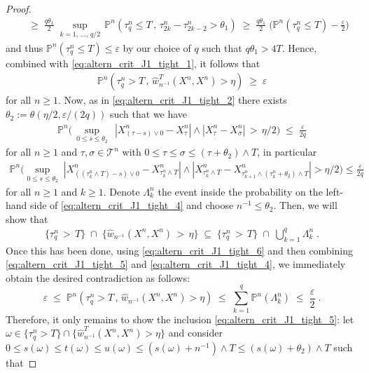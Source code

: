 \documentclass[11pt]{article}
\theoremstyle{definition}\newtheorem{example}[theorem]{Example}
\theoremstyle{definition}\newtheorem{counterexample}[theorem]{Counterexample}
\theoremstyle{definition}\newtheorem{remark}[theorem]{Remark}
\theoremstyle{definition}\newtheorem{defi}[theorem]{Definition}
\numberwithin{equation}{section}
\newcommand{\Pro}{\mathbb{P}}										%
\renewcommand{\sup}[1]{\underset{#1}{\operatorname{sup}}\;}					%
\renewcommand{\|}{\; : \, \;}											%
\begin{document}
\begin{proof}
\begin{align*}
		\;\;&\ge  \; \frac{q\theta_1}{2} \; \operatorname{sup}_{k=1,\, ...,\, q/2} \, \Pro^n(\tau^n_q \le T\, , \, \tau^n_{2k}-\tau^n_{2k-2} > \theta_1 ) \; \ge \; \frac{q\theta_1}{2} \; \Big( \Pro^n(\tau^n_q \le T) - \frac{\varepsilon}{2} \Big) 
	\end{align*}
	and thus $\Pro^n(\tau^n_q \le T)\le \varepsilon$ by our choice of $q$ such that $q \theta_1> 4T$. Hence, combined with \eqref{eq:altern_crit_J1_tight_1}, it follows that 
	\begin{align}
		\Pro^n(\tau^n_q> T \, , \, \hat w^T_{n^{-1}}(X^n,X^n)>\eta)  \;\ge  \; \varepsilon \label{eq:altern_crit_J1_tight_6}
	\end{align} 
	for all $n\ge 1$. Now, as in \eqref{eq:altern_crit_J1_tight_2} there exists $\theta_2:=\theta(\eta/2, \varepsilon/(2q))$ such that we have 
	\begin{align} 
		\Pro^n\Big( \, \sup{0\le s \le \theta_2} \, |X^n_{(\tau-s)\vee 0}-X^n_\tau|\wedge |X^n_{\tau}-X^n_{\sigma}| \, > \, \eta/2 \Big) \; \le \; \frac \varepsilon {2q} 
	\end{align}
	for all $n\ge 1$ and $\tau, \sigma \in \mathcal{T}^n$ with $0\le \tau \le \sigma \le (\tau+ \theta_2)\wedge T$, in particular 
	\begin{align} 
		\Pro^n\Big(  \sup{0\le s \le \theta_2} |X^n_{((\tau^n_{k} \wedge T) -s)\vee 0}-X^n_{\tau^n_k\wedge T}|\wedge |X^n_{\tau^n_k\wedge T}-X^n_{\tau^n_{k+1}\wedge (\tau^n_k+\theta_2)\wedge T}|  >  \eta/2 \Big)  \le  \frac \varepsilon {2q}\; \label{eq:altern_crit_J1_tight_4}
	\end{align}
	for all $n\ge 1$ and $k\ge 1$. Denote $\Lambda^n_k$ the event inside the probability on the left-hand side of \eqref{eq:altern_crit_J1_tight_4} and choose $n^{-1}\le \theta_2$. Then, we will show that 
	\begin{align} 
		\{\tau^n_q \, > \, T\} \; \cap \;\{ \hat w_{n^{-1}}(X^n,X^n)\, > \, \eta \} \; \subseteq \; \{\tau^n_q \, > \, T\} \; \cap \; \bigcup_{k=1}^{q} \Lambda^n_k  \; . \label{eq:altern_crit_J1_tight_5}
	\end{align}
	Once this has been done, using \eqref{eq:altern_crit_J1_tight_6} and then combining \eqref{eq:altern_crit_J1_tight_5} and \eqref{eq:altern_crit_J1_tight_4}, we immediately obtain the desired contradiction as follows:
	$$ \varepsilon \; \le \; \Pro^n ( \tau^n_q  >  T \, ,\, \hat w_{n^{-1}}(X^n,X^n) >  \eta) \; \le \; \sum_{k=1}^q \Pro^n (\Lambda^n_k) \; \le \; \frac {\varepsilon}{2} \; .$$
	Therefore, it only remains to show the inclusion \eqref{eq:altern_crit_J1_tight_5}: let $\omega \in \{\tau^n_q  >  T\}  \cap \{ \hat w^T_{n^{-1}}(X^n,X^n) > \eta \}$ and consider $0\le s(\omega) \le t(\omega) \le u(\omega) \le (s(\omega)+n^{-1})\wedge T \le (s(\omega)+\theta_2)\wedge T$ such that 

\end{proof}
\end{document}
